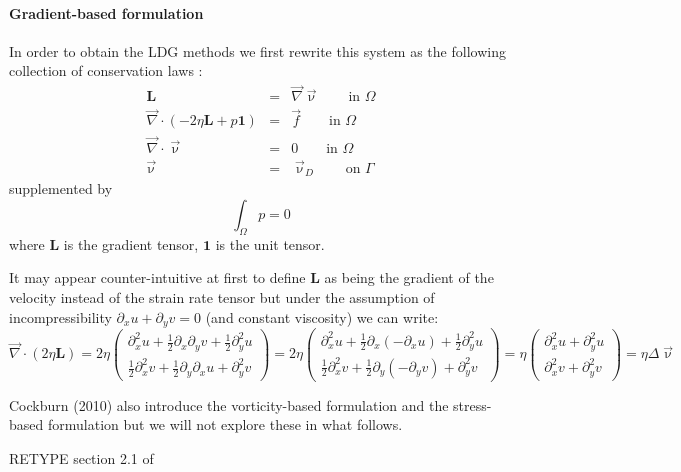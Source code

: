 \paragraph{Gradient-based formulation} In order to obtain the LDG methods we first rewrite this system as the following collection of conservation 
laws \cite{coks02}:
\begin{eqnarray}
{\bm L} &=& \vec\nabla \vec\upnu  \qquad \textrm{in } \Omega\\
\vec\nabla\cdot (-2\eta {\bm L} + p {\bm 1}) &=& \vec{f}  \qquad \textrm{in } \Omega\\
\vec\nabla\cdot\vec\upnu &=& 0 \qquad \textrm{in } \Omega\\
\vec{\upnu} &=& \vec{\upnu}_D \qquad \textrm{on } \Gamma
\end{eqnarray}
supplemented by
\[
\int_\Omega p =0
\]
where ${\bm L}$ is the gradient tensor, ${\bm 1}$ is the unit tensor. 
\begin{remark}
It may appear counter-intuitive at first to define ${\bm L}$ as being the gradient
of the velocity instead of the strain rate tensor but under the assumption
of incompressibility $\partial_x u + \partial_y v =0$ (and constant viscosity) we can write:
\[
\vec\nabla\cdot (2 \eta {\bm L}) = 
2\eta
\left(
\begin{array}{c}
\partial_x^2 u + \frac{1}{2}\partial_x\partial_y v + \frac{1}{2}\partial_y^2 u \\
\frac{1}{2}\partial_x^2 v + \frac{1}{2} \partial_y\partial_x u + \partial_y^2 v
\end{array}
\right)
=
2\eta
\left(
\begin{array}{c}
\partial_x^2 u + \frac{1}{2}\partial_x(-\partial_x u) + \frac{1}{2}\partial_y^2 u \\
\frac{1}{2}\partial_x^2 v + \frac{1}{2} \partial_y(-\partial_y v) + \partial_y^2 v
\end{array}
\right)
=
\eta
\left(
\begin{array}{c}
\partial_x^2 u + \partial_y^2 u \\
\partial_x^2 v + \partial_y^2 v
\end{array}
\right)
=
\eta \Delta \vec\upnu
\]
\end{remark}


\begin{remark}
Cockburn \etal (2010) \cite{conp10} also introduce the vorticity-based formulation and the stress-based 
formulation but we will not explore these in what follows.
\end{remark}

RETYPE section 2.1 of \cite{coks02}

